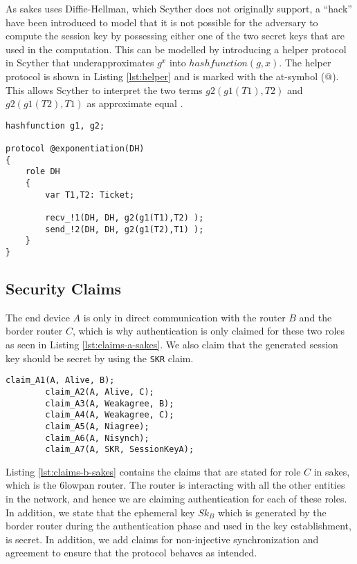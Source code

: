 As \gls{sakes} uses Diffie-Hellman, which Scyther does not originally support, a ``hack'' have been introduced to model that it is not possible for the adversary to compute the session key by possessing either one of the two secret keys that are used in the computation. This can be modelled by introducing a helper protocol in Scyther that underapproximates $g^{x}$ into $hashfunction(g, x)$. The helper protocol is shown in Listing \ref{lst:helper} and is marked with the at-symbol (@). This allows Scyther to interpret the two terms $g2(g1(T1),T2)$ and $g2(g1(T2), T1)$ as approximate equal \cite{scyther-manual}.

\begin{lstlisting}[caption={Helper protocol to model Diffie-Hellman in SAKES.}, label={lst:helper}]
hashfunction g1, g2;

protocol @exponentiation(DH)
{
	role DH
	{
		var T1,T2: Ticket;

		recv_!1(DH, DH, g2(g1(T1),T2) );
		send_!2(DH, DH, g2(g1(T2),T1) );
	}
}
\end{lstlisting}

\subsection{Security Claims}

The end device $A$ is only in direct communication with the router $B$ and the border router $C$, which is why authentication is only claimed for these two roles as seen in Listing \ref{lst:claims-a-sakes}. We also claim that the generated session key should be secret by using the \texttt{SKR} claim. 

\begin{lstlisting}[caption={Security claims for role A in SAKES.}, label={lst:claims-a-sakes}]
		claim_A1(A, Alive, B);
		claim_A2(A, Alive, C);
		claim_A3(A, Weakagree, B);
		claim_A4(A, Weakagree, C);
		claim_A5(A, Niagree);
		claim_A6(A, Nisynch);
		claim_A7(A, SKR, SessionKeyA);
\end{lstlisting}


Listing \ref{lst:claims-b-sakes} contains the claims that are stated for role $C$ in \gls{sakes}, which is the \gls{6lowpan} router. The router is interacting with all the other entities in the network, and hence we are claiming authentication for each of these roles. In addition, we state that the ephemeral key $Sk_B$ which is generated by the border router during the authentication phase and used in the key establishment, is secret. In addition, we add claims for non-injective synchronization and agreement to ensure that the protocol behaves as intended.

